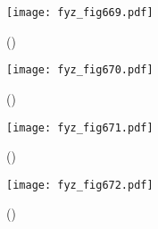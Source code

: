     \begin{figure}[ht!] %
      \centering
      \texttt{[image: fyz\_fig669.pdf]}
      \caption{
               (\cite[s.~707]{Feynman02})}
      \label{fyz:fig669}
    \end{figure}

    \begin{figure}[ht!] %
      \centering
      \texttt{[image: fyz\_fig670.pdf]}
      \caption{
               (\cite[s.~707]{Feynman02})}
      \label{fyz:fig670}
    \end{figure}


    \begin{figure}[ht!] %
      \centering
      \texttt{[image: fyz\_fig671.pdf]}
      \caption{
               (\cite[s.~707]{Feynman02})}
      \label{fyz:fig671}
    \end{figure}

    \begin{figure}[ht!] %
      \centering
      \texttt{[image: fyz\_fig672.pdf]}
      \caption{
               (\cite[s.~707]{Feynman02})}
      \label{fyz:fig672}
    \end{figure}

